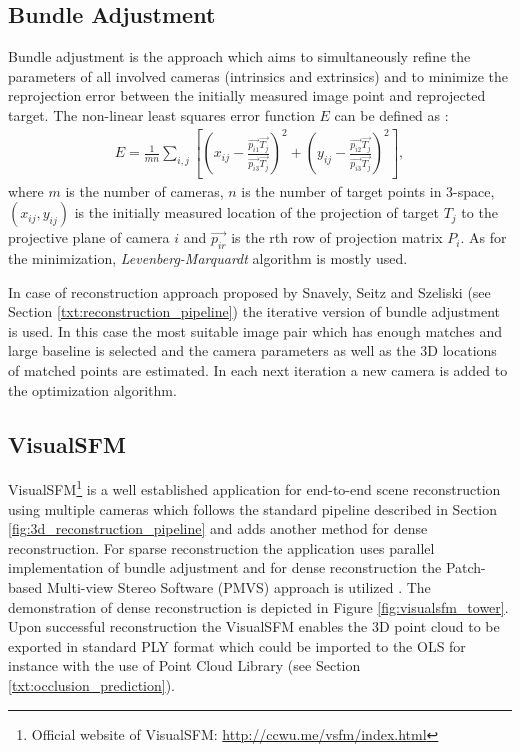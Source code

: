 \subsection{Bundle Adjustment} \label{txt:bundle_adjustment}

Bundle adjustment is the approach which aims to simultaneously refine the parameters of all involved cameras (intrinsics and extrinsics) and to minimize the reprojection error between the initially measured image point and reprojected target. The non-linear least squares error function $E$ can be defined as \cite{Forsyth:2002:CVM:580035}:
\begin{align}
	E = \frac{1}{mn}\sum_{i,j}{[(x_{ij} - \frac{\vec{p_{i1}}\vec{T_{j}}}{\vec{p_{i3}}\vec{T_{j}}})^{2} + (y_{ij} - \frac{\vec{p_{i2}}\vec{T_{j}}}{\vec{p_{i3}}\vec{T_{j}}})^{2}]},
\end{align}
where $m$ is the number of cameras, $n$ is the number of target points in 3-space, $(x_{ij}, y_{ij})$ is the initially measured location of the projection of target $T_{j}$ to the projective plane of camera $i$ and $\vec{p_{ir}}$ is the rth row of projection matrix $P_{i}$. As for the minimization, \textit{Levenberg-Marquardt} algorithm is mostly used. 

In case of reconstruction approach proposed by Snavely, Seitz and Szeliski \cite{Snavely:2006:PTE:1179352.1141964} (see Section \ref{txt:reconstruction_pipeline}) the iterative version of bundle adjustment is used. In this case the most suitable image pair which has enough matches and large baseline is selected and the camera parameters as well as the 3D locations of matched points are estimated. In each next iteration a new camera is added to the optimization algorithm.

\subsection{VisualSFM}

VisualSFM\footnote{Official website of VisualSFM: \url{http://ccwu.me/vsfm/index.html}} is a well established application for end-to-end scene reconstruction using multiple cameras which follows the standard pipeline described in Section \ref{fig:3d_reconstruction_pipeline} and adds another method for dense reconstruction. For sparse reconstruction the application uses parallel implementation of bundle adjustment \cite{ChangchangWu:2011:MBA:2191740.2191945} and for dense reconstruction the Patch-based Multi-view Stereo Software (PMVS) approach is utilized \cite{Furu:2010:PMVS}. The demonstration of dense reconstruction is depicted in Figure \ref{fig:visualsfm_tower}. Upon successful reconstruction the VisualSFM enables the 3D point cloud to be exported in standard PLY format which could be imported to the OLS for instance with the use of Point Cloud Library (see Section \ref{txt:occlusion_prediction}).

